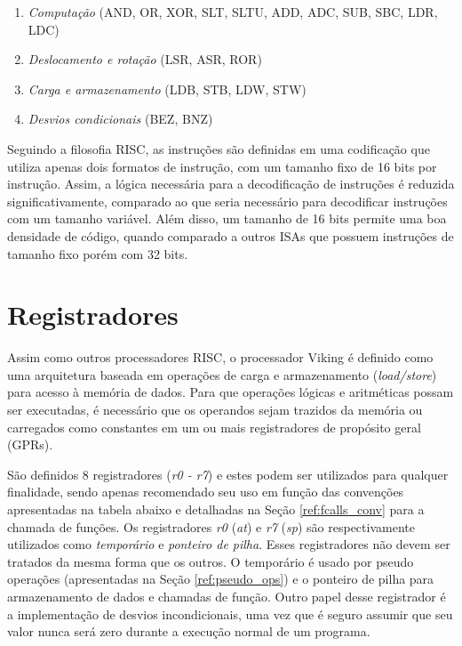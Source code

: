 \documentclass{extreport}
\begin{document}
\begin{enumerate}
\item \textit{Computação} (AND, OR, XOR, SLT, SLTU, ADD, ADC, SUB, SBC, LDR, LDC)
\item \textit{Deslocamento e rotação} (LSR, ASR, ROR)
\item \textit{Carga e armazenamento} (LDB, STB, LDW, STW)
\item \textit{Desvios condicionais} (BEZ, BNZ)
\end{enumerate}

Seguindo a filosofia RISC, as instruções são definidas em uma codificação que utiliza apenas dois formatos de instrução, com um tamanho fixo de 16 bits por instrução. Assim, a lógica necessária para a decodificação de instruções é reduzida significativamente, comparado ao que seria necessário para decodificar instruções com um tamanho variável. Além disso, um tamanho de 16 bits permite uma boa densidade de código, quando comparado a outros ISAs que possuem instruções de tamanho fixo porém com 32 bits.

\section{Registradores}
Assim como outros processadores RISC, o processador Viking é definido como uma arquitetura baseada em operações de carga e armazenamento (\textit{load/store}) para acesso à memória de dados. Para que operações lógicas e aritméticas possam ser executadas, é necessário que os operandos sejam trazidos da memória ou carregados como constantes em um ou mais registradores de propósito geral (GPRs).

São definidos 8 registradores (\textit{r0 - r7}) e estes podem ser utilizados para qualquer finalidade, sendo apenas recomendado seu uso em função das convenções apresentadas na tabela abaixo e detalhadas na Seção \ref{ref:fcalls_conv} para a chamada de funções. Os registradores \textit{r0} (\textit{at}) e \textit{r7} (\textit{sp}) são respectivamente utilizados como \textit{temporário} e \textit{ponteiro de pilha}. Esses registradores não devem ser tratados da mesma forma que os outros. O temporário é usado por pseudo operações (apresentadas na Seção \ref{ref:pseudo_ops}) e o ponteiro de pilha para armazenamento de dados e chamadas de função. Outro papel desse registrador é a implementação de desvios incondicionais, uma vez que é seguro assumir que seu valor nunca será zero durante a execução normal de um programa.
\end{document}
